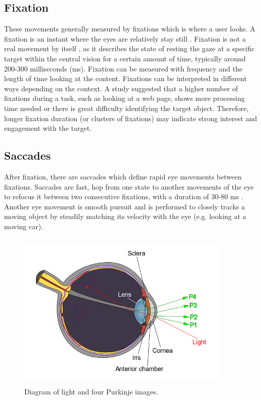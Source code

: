 \subsection{Fixation}

These movements generally measured by fixations which is where a user looks. A fixation is an instant where the eyes are relatively stay still \cite{15}. Fixation is not a real movement by itself \cite{13}, as it describes the state of resting the gaze at a specific target within the central vision for a certain amount of time, typically around 200-300 milliseconds (ms). Fixation can be measured with frequency and the length of time looking at the content. Fixations can be interpreted in different ways depending on the context. A study \cite{24} suggested that a higher number of fixations during a task, such as looking at a web page, shows more processing time needed or there is great difficulty identifying the target object. Therefore, longer fixation duration (or clusters of fixations) may indicate strong interest and engagement with the target.

\subsection{Saccades}

After fixation, there are saccades which define rapid eye movements between fixations. Saccades are fast, hop from one state to another movements of the eye to refocus it between two consecutive fixations, with a duration of 30-80 ms \cite{13}. Another eye movement is smooth pursuit and is performed to closely tracks a moving object by steadily matching its velocity with the eye (e.g. looking at a moving car).


\begin{figure}[!hbt]
  \centering
  \includegraphics[width=4in,height=3in]{pimage.png}
  \caption{Diagram of light and four Purkinje images.}
  \label{pimage}
\end{figure}

